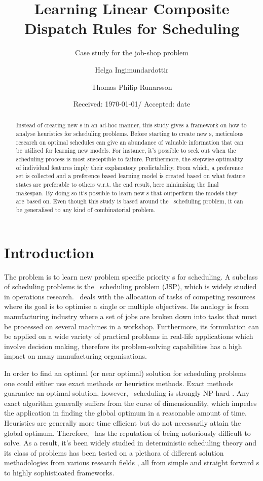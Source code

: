 \documentclass[smallextended]{svjour3}
\title{Learning Linear Composite Dispatch Rules for Scheduling}
\subtitle{Case study for the job-shop problem}
\author{Helga Ingimundardottir \and Thomas Philip Runarsson }
\institute{H. Ingimundardottir \at
	Dunhaga 5, IS-107 Reykjavik, Iceland \\
	Tel.: +354-525-4704\\
	Fax: +354-525-4632\\
	\email{hei2@hi.is}\\
	\and
	T.P. Runarsson \at
	Hjardarhagi 2-6, IS-107 Reykjavik, Iceland \\
	Tel.: +354-525-4733\\
	Fax: +354-525-4632\\
	\email{tpr@hi.is}\\
}
\date{Received: \today / Accepted: date}
\begin{document}
\maketitle


\begin{abstract}
Instead of creating new \dr s in an ad-hoc manner,
this study gives a framework on how to analyse heuristics for scheduling 
problems.  Before starting to create new \cdr s, 
meticulous research on optimal schedules can give an abundance of valuable 
information that can be utilised for learning new models.  For instance, it's 
possible to seek out when the scheduling process is most susceptible to 
failure.  Furthermore, the stepwise optimality of individual features imply 
their explanatory predictability. From which, a preference set is collected and 
a preference based learning model is created based on what feature states are 
preferable to others w.r.t. the end result, here minimising the final makespan.
By doing so it's possible to learn new \cdr s that 
outperform the models they are based on. 
Even though this study is based around the \jsp\ scheduling problem, it can be 
generalised to any kind of combinatorial problem.
\end{abstract}

\section{Introduction}\label{sec:introduction}
The problem is to learn new problem specific priority \dr s for scheduling. 
A subclass of scheduling problems is the \jsp\ scheduling problem (JSP), 
which is widely studied in operations research.  \JSP\ deals with the 
allocation of tasks of competing resources where its goal is to optimise a 
single or multiple objectives.  Its analogy is from manufacturing industry 
where a set of jobs are broken down into tasks that must be processed on 
several machines in a workshop.  
Furthermore, its formulation can be applied on a wide variety of practical 
problems in real-life applications which involve decision making, therefore its
problem-solving capabilities has a high impact on many manufacturing 
organisations.

In order to find an optimal (or near optimal) solution for scheduling problems 
one could either use exact methods or heuristics methods. Exact methods 
guarantee an optimal solution, however, \jsp\ scheduling is strongly NP-hard 
\cite{Garey76:NPhard}. Any exact algorithm generally suffers from the curse of 
dimensionality, which impedes the application in finding the global optimum in 
a reasonable amount of time. Heuristics are generally more time efficient but 
do not necessarily attain the global optimum. Therefore, \jsp\ has the 
reputation of being notoriously difficult to solve. 
As a result, it's been widely studied in deterministic scheduling theory and 
its class of problems has been tested on a plethora of different solution 
methodologies from various research fields \cite{Meeran12}, all from simple and 
straight forward \dr s to highly sophisticated frameworks.
\end{document}
